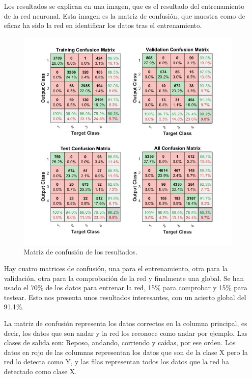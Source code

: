 \documentclass[12pt]{article}
\numberwithin{equation}{section}
\begin{document}
Los resultados se explican en una imagen, que es el resultado del entrenamiento de la red neuronal. Esta imagen es la matriz de confusión, que muestra como de eficaz ha sido la red en identificar los datos tras el entrenamiento.


\begin{figure}[h]
    \centering
    \includegraphics[width=1\textwidth]{confussionplaceholder.jpg}
    \caption{Matriz de confusión de los resultados.}
    \label{fig:mesh2}
\end{figure}

Hay cuatro matrices de confusión, una para el entrenamiento, otra para la validación, otra para la comprobación de la red y finalmente una global. Se han usado el 70\% de los datos para entrenar la red, 15\% para comprobar y 15\% para testear. Esto nos presenta unos resultados interesantes, con un acierto global del 91.1\%.

La matriz de confusión representa los datos correctos en la columna principal, es decir, los datos que son andar y la red los reconoce como andar por ejemplo. Las clases de salida son: Reposo, andando, corriendo y caídas, por ese orden. Los datos en rojo de las columnas representan los datos que son de la clase X pero la red lo detecta como Y, y las filas representan todos los datos que la red ha detectado como clase X.
\end{document}
